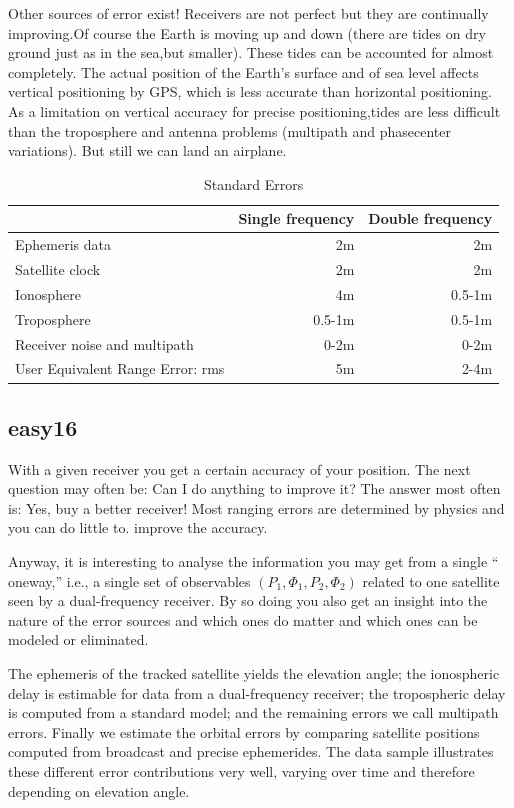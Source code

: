 		Other sources of error exist! Receivers are not perfect but they are continually improving.Of course the Earth is moving up and down (there are tides on dry ground just as in the sea,but smaller). These tides can be accounted for almost completely. The actual position of the Earth’s surface and of sea level affects vertical positioning by GPS, which is less accurate than horizontal positioning. As a limitation on vertical accuracy for precise positioning,tides are less difficult than the troposphere and antenna problems (multipath and phasecenter variations). But still we can land an airplane.
		\begin{table}
			\caption{Standard Errors}
			\centering
			\label{tab:9.6}
			\begin{tabularx}{\textwidth}{lrr}
				\hline
				  & Single frequency & Double frequency \\
				\hline
				Ephemeris data & 2m & 2m \\
				Satellite clock & 2m & 2m \\
				Ionosphere & 4m & 0.5-1m \\
				Troposphere & 0.5-1m & 0.5-1m \\
				Receiver noise and multipath & 0-2m & 0-2m \\
				\hline
				User Equivalent Range Error: rms & 5m & 2-4m \\
				\hline
			\end{tabularx}
		\end{table}
	
	\subsection{easy16}\label{subsec:easy16}
		With a given receiver you get a certain accuracy of your position. The next question may often be: Can I do anything to improve it? The answer most often is: Yes, buy a better receiver! Most ranging errors are determined by physics and you can do little to. improve the accuracy.
		
		Anyway, it is interesting to analyse the information you may get from a single “ oneway,” i.e., a single set of observables $(P_1,\Phi_1,P_2,\Phi_2)$ related to one satellite seen by a dual-frequency receiver. By so doing you also get an insight into the nature of the error sources and which ones do matter and which ones can be modeled or eliminated.
		
		The ephemeris of the tracked satellite yields the elevation angle; the ionospheric delay is estimable for data from a dual-frequency receiver; the tropospheric delay is computed from a standard model; and the remaining errors we call multipath errors. Finally we estimate the orbital errors by comparing satellite positions computed from broadcast and precise ephemerides. The data sample illustrates these different error contributions very well, varying over time and therefore depending on elevation angle.
		
